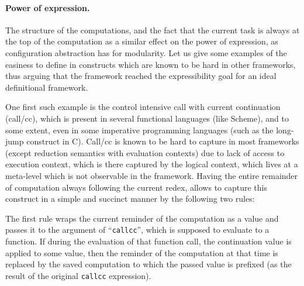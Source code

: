\documentclass{article}
\begin{document}
\paragraph{Power of expression.} The structure of the computations, and the fact that the current task is always at the top of the computation as a similar effect on the power of expression, as configuration abstraction has for modularity.  Let us give some examples of the easiness to define in \K constructs which are known to be hard in other frameworks, thus arguing that the \K framework reached the expressibility goal for an ideal definitional framework.

One first such example is the control intensive call with current continuation (call/cc), which is present in several functional languages (like Scheme), and to some extent, even in some imperative programming languages (such as the long-jump construct in C).  Call/cc is known to be hard to capture in most frameworks (except reduction semantics with evaluation contexts) due to lack of access to execution context, which is there captured by the logical context, which lives at a meta-level which is not observable in the framework.  Having the entire remainder of computation always following the current redex, allows \K to capture this construct in a simple and succinct manner by the following two rules:

The first rule wraps the current reminder of the computation as a value and passes it to the argument of ``{\tt callcc}'', which is supposed to evaluate to a function.  If during the evaluation of that function call, the continuation value is applied to some value, then the reminder of the computation at that time is replaced by the saved computation to which the passed value is prefixed (as the result of the original {\tt callcc} expression).
\end{document}
